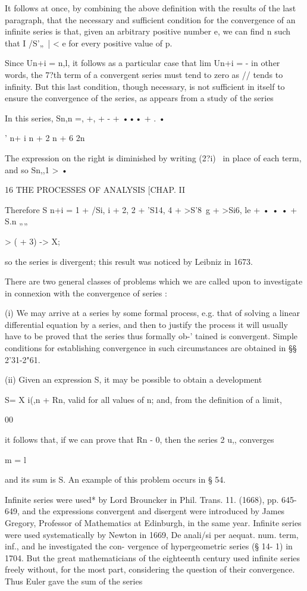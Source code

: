 It follows at once, by combining the above definition with the results
of the last paragraph, that the necessary and sufficient condition for
the convergence of an infinite series is that, given an arbitrary
positive number e, we can find n such that I /S'„\ | < e for every
positive value of p.

Since Un+i = n,l, it follows as a particular case that lim Un+i = - in
other words, the 7?th term of a convergent series must tend to zero as
// tends to infinity. But this last condition, though necessary, is
not sufficient in itself to ensure the convergence of the series, as
appears from a study of the series

In this series, Sn,n =, +, + - + ••• + . •

' n+ i n + 2 n + 6 2n

The expression on the right is diminished by writing (2?i)~ in place
of each term, and so Sn,,1 > •



16 THE PROCESSES OF ANALYSIS [CHAP. II

Therefore S n+i = 1 + /Si, i + 2, 2 + 'S14, 4 + >S'8\ g + >Si6, le + •
• • + S.n „„

> ( + 3) -> X;

so the series is divergent; this result was noticed by Leibniz in
1673.

There are two general classes of problems which we are called upon to
investigate in connexion with the convergence of series :

(i) We may arrive at a series by some formal process, e.g. that of
solving a linear differential equation by a series, and then to
justify the process it will usually have to be proved that the series
thus formally ob-' tained is convergent. Simple conditions for
establishing convergence in such circumstances are obtained in §§
2'31-2"61.

(ii) Given an expression S, it may be possible to obtain a development

S= X i(,n + Rn, valid for all values of n; and, from the definition
of a limit,

00

it follows that, if we can prove that Rn - 0, then the series 2 u,,
converges

m = l

and its sum is S. An example of this problem occurs in § 54.

Infinite series were used* by Lord Brouncker in Phil. Trans. 11.
(1668), pp. 645-649, and the expressions convergent and disergent were
introduced by James Gregory, Professor of Mathematics at Edinburgh, in
the same year. Infinite series were used systematically by Newton in
1669, De anali/si per aequat. num. term, inf., and he investigated the
con- vergence of hypergeometric series (§ 14- 1) in 1704. But the
great mathematicians of the eighteenth century used infinite series
freely without, for the most part, considering the question of their
convergence. Thus Euler gave the sum of the series

